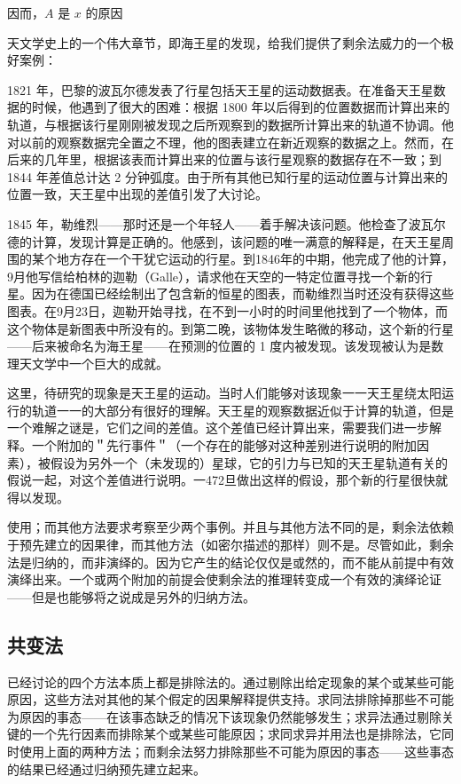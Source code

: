 因而，$A$ 是 $x$ 的原因

天文学史上的一个伟大章节，即海王星的发现，给我们提供了剩余法威力的一个极好案例：

1821 年，巴黎的波瓦尔德发表了行星包括天王星的运动数据表。在准备天王星数据的时候，他遇到了很大的困难：根据 1800 年以后得到的位置数据而计算出来的轨道，与根据该行星刚刚被发现之后所观察到的数据所计算出来的轨道不协调。他对以前的观察数据完全置之不理，他的图表建立在新近观察的数据之上。然而，在后来的几年里，根据该表而计算出来的位置与该行星观察的数据存在不一致；到 1844 年差值总计达 2 分钟弧度。由于所有其他已知行星的运动位置与计算出来的位置一致，天王星中出现的差值引发了大讨论。

1845 年，勒维烈——那时还是一个年轻人——着手解决该问题。他检查了波瓦尔德的计算，发现计算是正确的。他感到，该问题的唯一满意的解释是，在天王星周围的某个地方存在一个干犹它运动的行星。到1846年的中期，他完成了他的计算， 9月他写信给柏林的迦勒（Galle），请求他在天空的一特定位置寻找一个新的行星。因为在德国已经绘制出了包含新的恒星的图表，而勒维烈当时还没有获得这些图表。在9月23日，迦勒开始寻找，在不到一小时的时间里他找到了一个物体，而这个物体是新图表中所没有的。到第二晚，该物体发生略微的移动，这个新的行星——后来被命名为海王星——在预测的位置的 1 度内被发现。该发现被认为是数理天文学中一个巨大的成就。\cite{berry1961}

这里，待研究的现象是天王星的运动。当时人们能够对该现象一一天王星绕太阳运行的轨道一一的大部分有很好的理解。天王星的观察数据近似于计算的轨道，但是一个难解之谜是，它们之间的差值。这个差值已经计算出来，需要我们进一步解释。一个附加的＂先行事件＂（一个存在的能够对这种差别进行说明的附加因素），被假设为另外一个（未发现的）星球，它的引力与已知的天王星轨道有关的假说一起，对这个差值进行说明。一472旦做出这样的假设，那个新的行星很快就得以发现。

使用；而其他方法要求考察至少两个事例。并且与其他方法不同的是，剩余法依赖于预先建立的因果律，而其他方法（如密尔描述的那样）则不是。尽管如此，剩余法是归纳的，而非演绎的。因为它产生的结论仅仅是或然的，而不能从前提中有效演绎出来。一个或两个附加的前提会使剩余法的推理转变成一个有效的演绎论证——但是也能够将之说成是另外的归纳方法。

\subsection{共变法}
已经讨论的四个方法本质上都是排除法的。通过剔除出给定现象的某个或某些可能原因，这些方法对其他的某个假定的因果解释提供支持。求同法排除掉那些不可能为原因的事态——在该事态缺乏的情况下该现象仍然能够发生；求异法通过剔除关键的一个先行因素而排除某个或某些可能原因；求同求异并用法也是排除法，它同时使用上面的两种方法；而剩余法努力排除那些不可能为原因的事态——这些事态的结果已经通过归纳预先建立起来。

